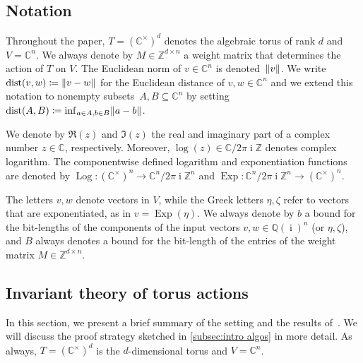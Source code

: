 \documentclass[10pt,a4paper]{article}
\theoremstyle{definition}
\DeclareMathOperator{\ii}{i}
\DeclareMathOperator{\Log}{Log}
\DeclareMathOperator{\Exp}{Exp}
\DeclareMathOperator{\dist}{dist}
\newcommand{\QQ}{\mathbb{Q}}
\newcommand{\CC}{\mathbb{C}}
\newcommand{\ZZ}{\mathbb{Z}}
\DeclarePairedDelimiter\norm{\lVert}{\rVert}
\numberwithin{equation}{section}
\begin{document}
\subsection{Notation}
Throughout the paper, $T=(\CC^\times)^d$ denotes the algebraic torus of rank $d$
and $V=\CC^n$. %
We always denote by $M\in\ZZ^{d\times n}$ a weight matrix that determines the action of $T$ on $V$.
The Euclidean norm of $v\in\CC^n$ is denoted~$\norm{v}$.
We write $\dist(v,w) \coloneqq \norm{v-w}$
for the Euclidean distance of $v,w\in\CC^n$
and we extend this notation to nonempty subsets~$A,B\subseteq\CC^n$
by setting~$\dist(A,B) \coloneqq \inf_{a\in A, b\in B} \norm{a-b}$.

We denote by $\Re(z)$ and $\Im(z)$ the real and imaginary part of a complex number $z\in\CC$, respectively.
Moreover,
$\log(z)\in\CC/2\pi\ii\ZZ$ denotes complex logarithm.
The componentwise defined logarithm and exponentiation functions are denoted by $\Log\colon (\CC^\times)^n\rightarrow\CC^n/2\pi\ii\ZZ^n$ and $\Exp:\CC^n/2\pi\ii\ZZ^n\rightarrow (\CC^\times)^n$.

The letters $v,w$ denote vectors in $V$,
while the Greek letters $\eta,\zeta$
refer to vectors that are exponentiated, as in $v=\Exp(\eta)$.
We always denote by $b$ a bound for the bit-lengths of the components
of the input vectors $v,w\in\QQ(\ii)^n$ (or $\eta,\zeta$),
and $B$ always denotes a bound for the bit-length of the entries of the weight matrix $M\in\ZZ^{d\times n}$.



\subsection{Invariant theory of torus actions}\label{se:invar-th-torus}
In this section, we present a brief summary of the setting and the results of~\cite{torus}.
We will discuss the proof strategy sketched in \cref{subsec:intro algos} in more detail.
As always, $T=(\CC^\times)^d$ is the $d$-dimensional torus and $V=\CC^n$.
\end{document}
